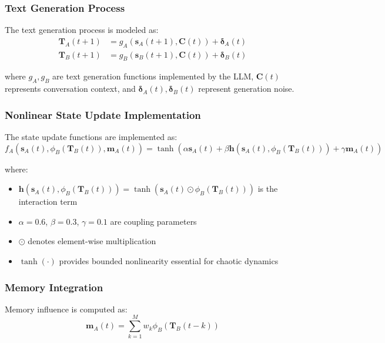 \documentclass[11pt,a4paper]{article}
\begin{document}
\subsubsection{Text Generation Process}

The text generation process is modeled as:
\begin{align}
\mathbf{T}_A(t+1) &= g_A(\mathbf{s}_A(t+1), \mathbf{C}(t)) + \boldsymbol{\delta}_A(t) \label{eq:text_a} \\
\mathbf{T}_B(t+1) &= g_B(\mathbf{s}_B(t+1), \mathbf{C}(t)) + \boldsymbol{\delta}_B(t) \label{eq:text_b}
\end{align}

where $g_A, g_B$ are text generation functions implemented by the LLM, $\mathbf{C}(t)$ represents conversation context, and $\boldsymbol{\delta}_A(t), \boldsymbol{\delta}_B(t)$ represent generation noise.

\subsubsection{Nonlinear State Update Implementation}

The state update functions are implemented as:
\begin{equation}
f_A(\mathbf{s}_A(t), \phi_B(\mathbf{T}_B(t)), \mathbf{m}_A(t)) = \tanh\left(\alpha \mathbf{s}_A(t) + \beta \mathbf{h}(\mathbf{s}_A(t), \phi_B(\mathbf{T}_B(t))) + \gamma \mathbf{m}_A(t)\right)
\label{eq:nonlinear_update}
\end{equation}

where:
\begin{itemize}
    \item $\mathbf{h}(\mathbf{s}_A(t), \phi_B(\mathbf{T}_B(t))) = \tanh(\mathbf{s}_A(t) \odot \phi_B(\mathbf{T}_B(t)))$ is the interaction term
    \item $\alpha = 0.6$, $\beta = 0.3$, $\gamma = 0.1$ are coupling parameters
    \item $\odot$ denotes element-wise multiplication
    \item $\tanh(\cdot)$ provides bounded nonlinearity essential for chaotic dynamics
\end{itemize}

\subsubsection{Memory Integration}

Memory influence is computed as:
\begin{equation}
\mathbf{m}_A(t) = \sum_{k=1}^{M} w_k \phi_B(\mathbf{T}_B(t-k))
\label{eq:memory}
\end{equation}
\end{document}
